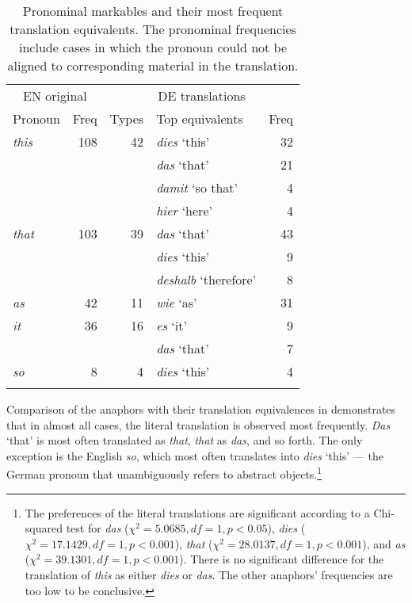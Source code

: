 \documentclass[output=paper]{LSP/langsci}
\begin{document}
\begin{table}
\begin{tabularx}{\textwidth}{X r r X r } 
\midrule\midrule
\multicolumn{2}{c}{{EN original}} & \multicolumn{3}{c}{{DE translations}} \\
{Pronoun} & {Freq} & {Types} &  {Top
equivalents} & {Freq} \\ \midrule
\textit{this} & 108 & 42 & \textit{dies} `this'  & 32 \\
                  &    &&  \textit{das} `that' & 21 \\
                  &    &&  \textit{damit} `so that'  & 4 \\
                  &    &&  \textit{hier} `here' &  4 \\ \midrule
 \textit{that} &103 &  39 & \textit{das} `that'  & 43 \\
               &       &&  \textit{dies} `this' &  9 \\
               &       && \textit{deshalb} `therefore' &  8\\ \midrule
\textit{as} & 42 & 11 & \textit{wie}  `as' &  31\\ \midrule
\textit{it} & 36&  16 & \textit{es} `it' &  9 \\
               &       & &  \textit{das} `that' &  7\\ \midrule
\textit{so} & 8& 4 & \textit{dies} `this' &  4 \\
\lspbottomrule
\end{tabularx} 
\caption{Pronominal markables and their most frequent translation equivalents.  The pronominal frequencies include cases in which the pronoun could not be aligned to corresponding material in the translation.} \label{tab:type_pron_equiv}
\end{table}


Comparison of the anaphors with their translation equivalences in  demonstrates that in almost all cases, the literal translation  is observed most frequently. \textit{Das} `that' is most often translated as \textit{that}, \textit{that} as \textit{das}, and so forth. The only exception is the English \textit{so}, which most often translates into \textit{dies} `this'  --- the German pronoun that unambiguously refers to abstract objects.\footnote{The preferences of the literal translations are significant according to a Chi-squared test  for \textit{das} ($\chi^2=5.0685, df=1, p<0.05$), \textit{dies} ($\chi^2=17.1429, df=1, p<0.001$), \textit{that} ($\chi^2=28.0137, df=1, p<0.001$), and \textit{as} ($\chi^2=39.1301, df=1, p<0.001$). There is no significant difference for the translation of \textit{this} as either \textit{dies} or \textit{das}. The other anaphors' frequencies are  too low to be conclusive.}
\end{document}
